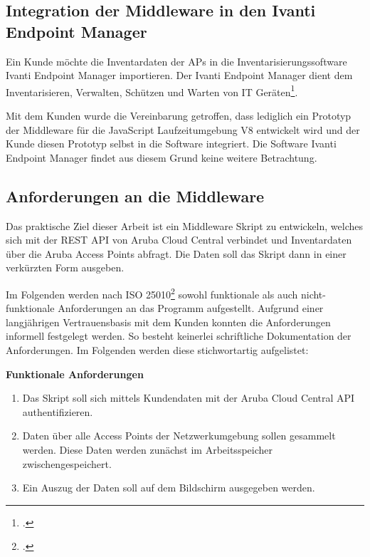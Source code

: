 \subsection{Integration der Middleware in den Ivanti Endpoint Manager}\label{chapter:einleitung}

Ein Kunde möchte die Inventardaten der APs in die Inventarisierungssoftware Ivanti Endpoint Manager importieren. Der Ivanti Endpoint Manager dient dem Inventarisieren, Verwalten, Schützen und Warten von IT Geräten\footcite[S. 3]{ivanti_inc_transparenz_2021}. 

Mit dem Kunden wurde die Vereinbarung getroffen, dass lediglich ein Prototyp der Middleware für die JavaScript Laufzeitumgebung V8 entwickelt wird und der Kunde diesen Prototyp selbst in die Software integriert. Die Software Ivanti Endpoint Manager findet aus diesem Grund keine weitere Betrachtung.

\subsection{Anforderungen an die Middleware}\label{subsection:anforderungen-an-die-middleware}

Das praktische Ziel dieser Arbeit ist ein Middleware Skript zu entwickeln, welches sich mit der REST API von Aruba Cloud Central verbindet und Inventardaten über die Aruba Access Points abfragt. Die Daten soll das Skript dann in einer verkürzten Form ausgeben.

Im Folgenden werden nach ISO 25010\footcite{isoiec_25010_isoiec_2011} sowohl funktionale als auch nicht-funktionale Anforderungen an das Programm aufgestellt. Aufgrund einer langjährigen Vertrauensbasis mit dem Kunden konnten die Anforderungen informell festgelegt werden. So besteht keinerlei schriftliche Dokumentation der Anforderungen. Im Folgenden werden diese stichwortartig aufgelistet:

\textbf{Funktionale Anforderungen}

\begin{enumerate}
    \item Das Skript soll sich mittels Kundendaten mit der Aruba Cloud Central API authentifizieren.
    \item Daten über alle Access Points der Netzwerkumgebung sollen gesammelt werden. Diese Daten werden zunächst im Arbeitsspeicher zwischengespeichert.
    \item Ein Auszug der Daten soll auf dem Bildschirm ausgegeben werden. 
\end{enumerate}

